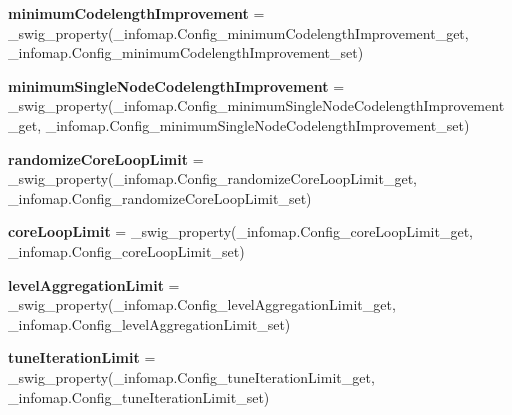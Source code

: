 \begin{DoxyCompactItemize}
\item 
\mbox{\label{classinfomapfolder_1_1infomap_1_1Config_ad783896d7d44e6f756dea2c445ed8436}} 
{\bfseries minimum\+Codelength\+Improvement} = \+\_\+swig\+\_\+property(\+\_\+infomap.\+Config\+\_\+minimum\+Codelength\+Improvement\+\_\+get, \+\_\+infomap.\+Config\+\_\+minimum\+Codelength\+Improvement\+\_\+set)
\item 
\mbox{\label{classinfomapfolder_1_1infomap_1_1Config_aeb289387629be5784ba7ad9639946b4a}} 
{\bfseries minimum\+Single\+Node\+Codelength\+Improvement} = \+\_\+swig\+\_\+property(\+\_\+infomap.\+Config\+\_\+minimum\+Single\+Node\+Codelength\+Improvement\+\_\+get, \+\_\+infomap.\+Config\+\_\+minimum\+Single\+Node\+Codelength\+Improvement\+\_\+set)
\item 
\mbox{\label{classinfomapfolder_1_1infomap_1_1Config_a1a95d880fe8e9d122240dae24b7f6904}} 
{\bfseries randomize\+Core\+Loop\+Limit} = \+\_\+swig\+\_\+property(\+\_\+infomap.\+Config\+\_\+randomize\+Core\+Loop\+Limit\+\_\+get, \+\_\+infomap.\+Config\+\_\+randomize\+Core\+Loop\+Limit\+\_\+set)
\item 
\mbox{\label{classinfomapfolder_1_1infomap_1_1Config_a7275247128ac300e173fad760fd522e1}} 
{\bfseries core\+Loop\+Limit} = \+\_\+swig\+\_\+property(\+\_\+infomap.\+Config\+\_\+core\+Loop\+Limit\+\_\+get, \+\_\+infomap.\+Config\+\_\+core\+Loop\+Limit\+\_\+set)
\item 
\mbox{\label{classinfomapfolder_1_1infomap_1_1Config_af4963e8b24192515ff74ac1fc2c99bc6}} 
{\bfseries level\+Aggregation\+Limit} = \+\_\+swig\+\_\+property(\+\_\+infomap.\+Config\+\_\+level\+Aggregation\+Limit\+\_\+get, \+\_\+infomap.\+Config\+\_\+level\+Aggregation\+Limit\+\_\+set)
\item 
\mbox{\label{classinfomapfolder_1_1infomap_1_1Config_abb023efdad26f6e03c7c40ea3ae49beb}} 
{\bfseries tune\+Iteration\+Limit} = \+\_\+swig\+\_\+property(\+\_\+infomap.\+Config\+\_\+tune\+Iteration\+Limit\+\_\+get, \+\_\+infomap.\+Config\+\_\+tune\+Iteration\+Limit\+\_\+set)
\item 

\end{DoxyCompactItemize}
